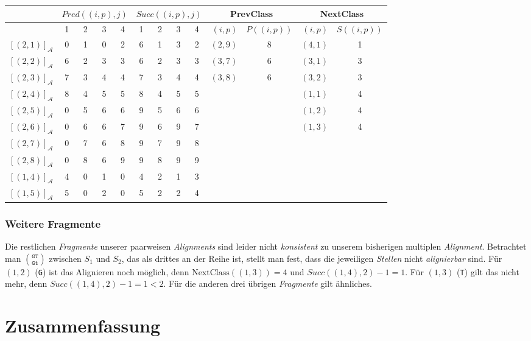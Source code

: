 \begin{tabular}{r|cccc|cccc||r|c|r|c}
	& \multicolumn{4}{c|}{$Pred((i,p),j)$} & \multicolumn{4}{c||}{$Succ((i,p),j)$} & \multicolumn{2}{c|}{\textrm{PrevClass}} & \multicolumn{2}{c}{\textrm{NextClass}} \\ \hline
	\diagbox[dir=NW]{$(i,p)$}{$j$} & 1 & 2 & 3 & 4 & 1 & 2 & 3 & 4 & $(i,p)$ & $P((i,p))$ & $(i,p)$ & $S((i,p))$ \\ \hline
	$[(2,1)]_{\mathcal{A}}$ & 0 & 1 & 0 & 2 & 6 & 1 & 3 & 2 & $(2,9)$ & 8 & $(4,1)$ & 1 \\
	$[(2,2)]_{\mathcal{A}}$ & 6 & 2 & 3 & 3 & 6 & 2 & 3 & 3 & $(3,7)$ & 6 & $(3,1)$ & 3 \\
	$[(2,3)]_{\mathcal{A}}$ & 7 & 3 & 4 & 4 & 7 & 3 & 4 & 4 & $(3,8)$ & 6 & $(3,2)$ & 3 \\
	$[(2,4)]_{\mathcal{A}}$ & 8 & 4 & 5 & 5 & 8 & 4 & 5 & 5 & & & $(1,1)$ & 4 \\
	$[(2,5)]_{\mathcal{A}}$ & 0 & 5 & 6 & 6 & 9 & 5 & 6 & 6 & & & $(1,2)$ & 4 \\
	$[(2,6)]_{\mathcal{A}}$ & 0 & 6 & 6 & 7 & 9 & 6 & 9 & 7 & & & $(1,3)$ & 4 \\
	$[(2,7)]_{\mathcal{A}}$ & 0 & 7 & 6 & 8 & 9 & 7 & 9 & 8 & & & & \\
	$[(2,8)]_{\mathcal{A}}$ & 0 & 8 & 6 & 9 & 9 & 8 & 9 & 9 & & & & \\
	$[(1,4)]_{\mathcal{A}}$ & 4 & 0 & 1 & 0 & 4 & 2 & 1 & 3 & & & & \\
	$[(1,5)]_{\mathcal{A}}$ & 5 & 0 & 2 & 0 & 5 & 2 & 2 & 4 & & & & 
\end{tabular}
\normalsize

\subsubsection{Weitere Fragmente}

Die restlichen \emph{Fragmente} unserer paarweisen \emph{Alignments} sind leider nicht \emph{konsistent} zu unserem bisherigen multiplen \emph{Alignment}. Betrachtet man ${\texttt{GT}}\choose{\texttt{Gt}}$ zwischen $S_1$ und $S_2$, das als drittes an der Reihe ist, stellt man fest, dass die jeweiligen \emph{Stellen} nicht \emph{alignierbar} sind. Für $(1,2)$ (\texttt{G}) ist das Alignieren noch möglich, denn $\textrm{NextClass}((1,3)) = 4$ und $Succ((1,4),2) - 1 = 1$. Für $(1,3)$ (\texttt{T}) gilt das nicht mehr, denn $Succ((1,4),2) - 1 = 1 < 2$. Für die anderen drei übrigen \emph{Fragmente} gilt ähnliches.

\section{Zusammenfassung}

